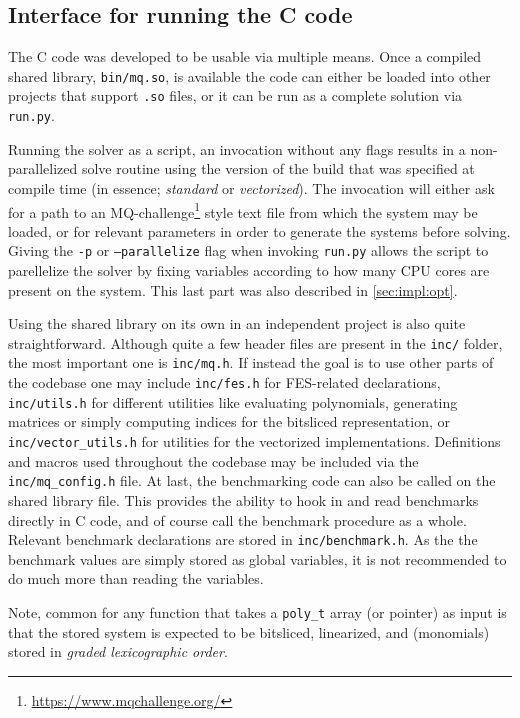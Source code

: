 \subsection{Interface for running the C code} \label{sec:impl:interface}
The C code was developed to be usable via multiple means. Once a compiled shared library, \texttt{bin/mq.so}, is available the code can either be loaded into other projects that support \texttt{.so} files, or it can be run as a complete solution via \texttt{run.py}. 

Running the solver as a script, an invocation without any flags results in a non-parallelized solve routine using the version of the build that was specified at compile time (in essence; \textit{standard} or \textit{vectorized}). The invocation will either ask for a path to an MQ-challenge\footnote{\url{https://www.mqchallenge.org/}} style text file from which the system may be loaded, or for relevant parameters in order to generate the systems before solving. Giving the \texttt{-p} or \texttt{--parallelize} flag when invoking \texttt{run.py} allows the script to parellelize the solver by fixing variables according to how many CPU cores are present on the system. This last part was also described in \cref{sec:impl:opt}.

Using the shared library on its own in an independent project is also quite straightforward. Although quite a few header files are present in the \texttt{inc/} folder, the most important one is \texttt{inc/mq.h}. If instead the goal is to use other parts of the codebase one may include \texttt{inc/fes.h} for FES-related declarations, \texttt{inc/utils.h} for different utilities like evaluating polynomials, generating matrices or simply computing indices for the bitsliced representation, or \texttt{inc/vector\_utils.h} for utilities for the vectorized implementations. Definitions and macros used throughout the codebase may be included via the \texttt{inc/mq\_config.h} file. At last, the benchmarking code can also be called on the shared library file. This provides the ability to hook in and read benchmarks directly in C code, and of course call the benchmark procedure as a whole. Relevant benchmark declarations are stored in \texttt{inc/benchmark.h}. As the the benchmark values are simply stored as global variables, it is not recommended to do much more than reading the variables. 

Note, common for any function that takes a \texttt{poly\_t} array (or pointer) as input is that the stored system is expected to be bitsliced, linearized, and (monomials) stored in \textit{graded lexicographic order}.


